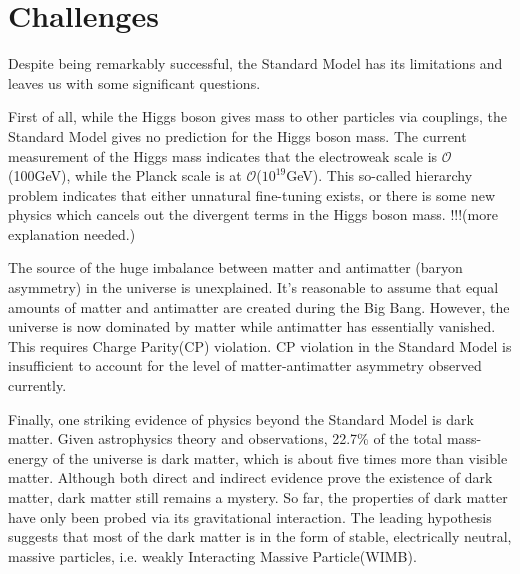 \section{Challenges}
\par Despite being remarkably successful, the Standard Model has its limitations and leaves us with some significant questions.

\par First of all, while the Higgs boson gives mass to other particles via couplings, the Standard Model gives no prediction for
the Higgs boson mass. The current measurement of the Higgs mass indicates that the electroweak scale is $\mathcal{O}$(100GeV), 
while the Planck scale is at $\mathcal{O}$($10^{19}$GeV). This so-called hierarchy problem indicates that either unnatural fine-tuning exists, or there 
is some new physics which cancels out the divergent terms in the Higgs boson mass.
!!!(more explanation needed.)



\par The source of the huge imbalance between matter and antimatter (baryon asymmetry) in the universe is unexplained. 
It's reasonable to assume that equal amounts of matter and antimatter are created during the Big Bang. However, 
the universe is now dominated by matter while antimatter has essentially vanished. This requires Charge Parity(CP) violation.
CP violation in the Standard Model is insufficient to account for the level of matter-antimatter asymmetry observed currently.

\par Finally, one striking evidence of physics beyond the Standard Model is dark matter. Given astrophysics theory and observations, 
22.7\% of the total mass-energy of the universe is dark matter, which is about five times more than visible matter. 
Although both direct and indirect evidence prove the existence of dark matter, dark matter still remains a mystery. 
So far, the properties of dark matter have only been probed via its gravitational interaction. The leading hypothesis suggests that 
most of the dark matter is in the form of stable, electrically neutral, massive particles, i.e. weakly Interacting Massive Particle(WIMB).

